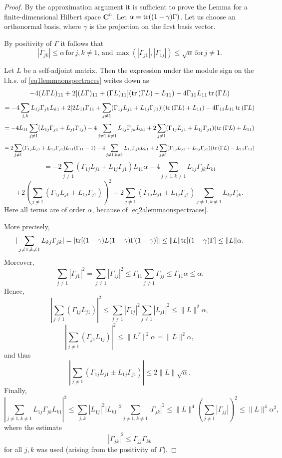 \documentclass[12pt]{article}
\def\C{\mathbf{C}}
\def\tr{\rm{tr}}
\def\al{\alpha}
\def\ga{\gamma}
\newcommand{\Ga}{\Gamma}
\begin{document}
 \begin{proof}
 By the approximation argument it is sufficient to prove the Lemma for a finite-dimensional Hilbert space $\C^n$.
 Let $\al= {\tr} ((1-\ga) \Ga)$.
 Let us choose an orthonormal basis, where $\ga$ is the projection on the first basis vector.

 By positivity of $\Ga$ it follows that
\begin{equation}
\label{eq2alemmaonspectraces}
|\Ga_{jk}|\le \al \, \text{for} \, j,k\neq 1, \,  \text{and}
\, \max(|\Ga_{j1}|,|\Ga_{1j}|)\le \sqrt \al \, \text{for} \, j\neq 1.
\end{equation}

Let $L$ be a self-adjoint matrix.
 Then the expression under the module sign on the l.h.s. of \eqref{eq1lemmaonspectraces} writes down as
 \[
  -4 (L\Ga L)_{11} +2 [(L \Ga)_{11}+(\Ga L)_{11}]({\tr}\,(\Ga L)+L_{11})-4 \Ga_{11} L_{11}\, {\tr}\,(\Ga L)
\]
\[
=-4\sum_{j,k} L_{1j}\Ga_{jk}L_{k1}+2[2L_{11}\Ga_{11}+\sum_{j\neq 1} (\Ga_{1j}L_{j1}+L_{1j}\Ga_{j1})]({\tr}\,(\Ga L)+L_{11})
-4 \Ga_{11} L_{11}\, {\tr}\,(\Ga L)
\]
\[
=-4 L_{11} \sum_{j\neq 1} (L_{1j}\Ga_{j1}+L_{j1}\Ga_{1j})-4\sum_{j\neq 1,k\neq 1} L_{1j}\Ga_{jk}L_{k1}
+2\sum_{j\neq 1} (\Ga_{1j}L_{j1}+L_{1j}\Ga_{j1})({\tr}\,(\Ga L)+L_{11})
\]
\[
=2\sum_{j\neq 1} (\Ga_{1j}L_{j1}+L_{1j}\Ga_{j1})L_{11}(\Ga_{11}-1)
-4\sum_{j\neq 1,k\neq 1} L_{1j}\Ga_{jk}L_{k1}
+2\sum_{j\neq 1} (\Ga_{1j}L_{j1}+L_{1j}\Ga_{j1})({\tr}\,(\Ga L)-L_{11}\Ga_{11})
\]
\[
=-2\sum_{j\neq 1} (\Ga_{1j}L_{j1}+L_{1j}\Ga_{j1})L_{11}\al
-4\sum_{j\neq 1,k\neq 1} L_{1j}\Ga_{jk}L_{k1}
\]
\[
+2\left(\sum_{j\neq 1} (\Ga_{1j}L_{j1}+L_{1j}\Ga_{j1})\right)^2
+2\sum_{j\neq 1} (\Ga_{1j}L_{j1}+L_{1j}\Ga_{j1})
\sum_{j\neq 1,k\neq 1} L_{kj}\Ga_{jk}.
\]
Here all terms are of order $\al$, because of \eqref{eq2alemmaonspectraces}.

More precisely,
\[
|\sum_{j\neq 1,k\neq 1} L_{kj}\Ga_{jk}|=|{\tr}[(1-\ga) L(1-\ga)\Ga(1-\ga)]|
\le \|L\| {\tr}[(1-\ga)\Ga]\le \|L\| \al.
\]
Moreover,
\[
\sum_{j\neq 1}|\Ga_{j1}|^2=\sum_{j\neq 1}|\Ga_{1j}|^2
\le \Ga_{11} \sum_{j\neq 1} \Ga_{jj}\le \Ga_{11}\al \le \al.
\]
Hence,
\[
|\sum_{j\neq 1} (\Ga_{1j}L_{j1})|^2
\le \sum_{j\neq 1} |\Ga_{1j}|^2 \sum_{j\neq 1} |L_{j1}|^2\le \|L\|^2 \al,
\]
\[
|\sum_{j\neq 1} (\Ga_{j1}L_{1j})|^2\le \|L^T\|^2 \al= \|L\|^2 \al,
\]
and thus
\begin{equation}
\label{eq3lemmaonspectraces}
|\sum_{j\neq 1} (\Ga_{1j}L_{j1}\pm L_{1j}\Ga_{j1})|\le 2\|L\| \sqrt \al.
\end{equation}
Finally,
\[
|\sum_{j\neq 1,k\neq 1} L_{1j}\Ga_{jk}L_{k1}|^2 \le \sum_{j,k} |L_{1j}|^2 |L_{k1}|^2
\sum_{j\neq 1,k\neq 1} |\Ga_{jk}|^2 \le \|L\|^4 (\sum_{j\neq 1} |\Ga_{jj}|)^2
\le \|L\|^4 \al^2,
\]
where the estimate
\[
|\Ga_{jk}|^2 \le \Ga_{jj}\Ga_{kk}
\]
for all $j,k$ was used (arising from the positivity of $\Ga$).


\end{proof}
\end{document}
